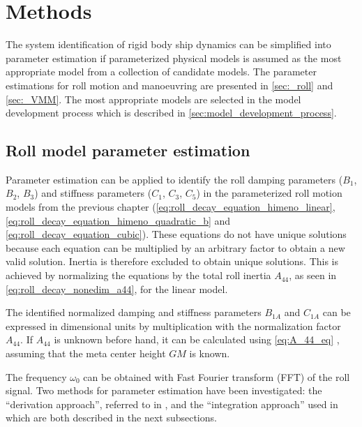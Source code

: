 \chapter{Methods\label{ch:methods}}
The system identification of rigid body ship dynamics can be simplified into parameter estimation if parameterized physical models is assumed as the most appropriate model from a collection of candidate models.
The parameter estimations for roll motion and manoeuvring are presented in \autoref{sec:_roll} and \autoref{sec:_VMM}. The most appropriate models are selected in the model development process which is described in \autoref{sec:model_development_process}.

\section{Roll model parameter estimation} \label{sec:_roll}
\noindent Parameter estimation can be applied to identify the roll damping parameters ($B_1$, $B_2$, $B_3$) and stiffness parameters ($C_1$, $C_3$, $C_5$) in the parameterized roll motion models from the previous chapter (\autoref{eq:roll_decay_equation_himeno_linear}, \autoref{eq:roll_decay_equation_himeno_quadratic_b} and \autoref{eq:roll_decay_equation_cubic}). These equations do not have unique solutions because each equation can be multiplied by an arbitrary factor to obtain a new valid solution. Inertia is therefore excluded to obtain unique solutions. This is achieved by normalizing the equations by the total roll inertia $A_{44}$, as seen in \autoref{eq:roll_decay_nonedim_a44}, for the linear model.



\noindent The identified normalized damping and stiffness parameters $B_{1A}$ and $C_{1A}$ can be expressed in dimensional units by multiplication with the normalization factor $A_{44}$. If $A_{44}$ is unknown before hand, it can be calculated using \autoref{eq:A_44_eq} \cite{piehl_ship_2016}, assuming that the meta center height $GM$ is known.


\noindent The frequency $\omega_0$ can be obtained with Fast Fourier transform (FFT) of the roll signal. 
Two methods for parameter estimation have been investigated: the ``derivation approach'', referred to in \textcite{imo_1200_2006}, and the ``integration approach'' used in \textcite{soder_assessment_2019} which are both described in the next subsections. 

